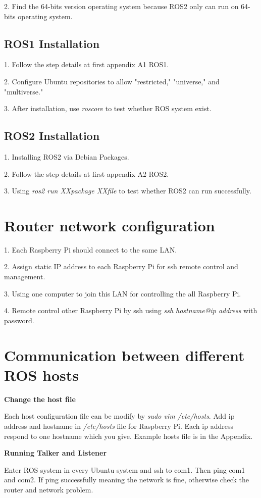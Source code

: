 \documentclass{mproj}
\begin{document}
2. Find the 64-bits version operating system because ROS2 only can run on 64-bits operating system.

\subsection{ROS1 Installation}

1. Follow the step details at first appendix A1 ROS1.

2. Configure Ubuntu repositories to allow "restricted," "universe," and "multiverse."

3. After installation, use \textit{roscore} to test whether ROS system exist.

\subsection{ROS2 Installation}

1. Installing ROS2 via Debian Packages.

2. Follow the step details at first appendix A2 ROS2. 

3. Using \textit{ros2 run XXpackage XXfile} to test whether ROS2 can run successfully.


\section{Router network configuration}
1. Each Raspberry Pi should connect to the same LAN.

2. Assign static IP address to each Raspberry Pi for ssh remote control and management.

3. Using one computer to join this LAN for controlling the all Raspberry Pi.

4. Remote control other Raspberry Pi by ssh using \textit{ssh {hostname}@{ip address}} with password.


\section{Communication between different ROS hosts}
\textbf{Change the host file} 

Each host configuration file can be modify by \textit{sudo vim /etc/hosts}. Add ip address and hostname in \textit{/etc/hosts} file for Raspberry Pi. Each ip address respond to one hostname which you give.
Example hosts file is in the Appendix.

\textbf{Running Talker and Listener}

Enter ROS system in every Ubuntu system and ssh to com1. Then ping com1 and com2. If ping successfully meaning the network is fine, otherwise check the router and network problem.
\end{document}
